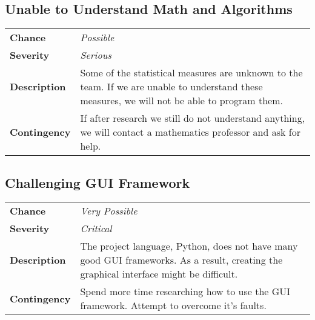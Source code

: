 \documentclass[12pt]{article}
\begin{document}
\subsection*{Unable to Understand Math and Algorithms}
\begin{tabular}{ l p{10cm} }
	\textbf{Chance} & \textit{Possible} \\
	\textbf{Severity} & \textit{Serious} \\
	\textbf{Description} & Some of the statistical measures are unknown to the
		team. If we are unable to understand these measures, we will not be
		able to program them. \\
	\textbf{Contingency} & If after research we still do not understand
		anything, we will contact a mathematics professor and ask for help. \\
\end{tabular}

\subsection*{Challenging GUI Framework}
\begin{tabular}{ l p{10cm} }
	\textbf{Chance} & \textit{Very Possible} \\
	\textbf{Severity} & \textit{Critical} \\
	\textbf{Description} & The project language, Python, does not have many
		good GUI frameworks. As a result, creating the graphical interface
		might be difficult. \\
	\textbf{Contingency} & Spend more time researching how to use the GUI
		framework. Attempt to overcome it's faults. \\
\end{tabular}
\end{document}
